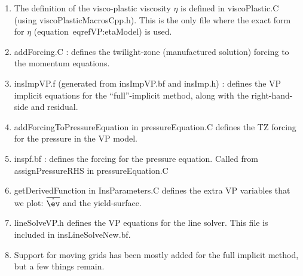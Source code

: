 \begin{enumerate}
  \item The definition of the visco-plastic viscosity $\eta$ is defined in viscoPlastic.C (using viscoPlasticMacrosCpp.h).
        This is the only file where the exact form for $\eta$ (equation~eqref{VP:etaModel}) is used. 
  \item addForcing.C : defines the twilight-zone (manufactured solution) 
        forcing to the momentum equations.
  \item insImpVP.f (generated from insImpVP.bf and insImp.h) : defines the VP implicit equations for the ``full''-implicit method, along with the
         right-hand-side and residual.
  \item addForcingToPressureEquation in pressureEquation.C defines the TZ forcing for the pressure in the VP model. 
  \item inspf.bf : defines the forcing for the pressure equation. Called from assignPressureRHS in pressureEquation.C
  \item getDerivedFunction in InsParameters.C defines the extra VP variables that we plot: $\esr$
    and the yield-surface.
  \item lineSolveVP.h defines the VP equations for the line solver. This file is included
        in insLineSolveNew.bf.
  \item Support for moving grids has been mostly added for the full implicit method, but a few things remain.
\end{enumerate}





